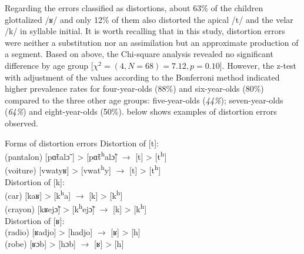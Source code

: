 \documentclass[output=paper,newtxmath,modfonts,nonflat,draftmode]{langsci/langscibook}
\begin{document}
Regarding the errors classified as distortions, about 63\% of the children glottalized /ʁ/ and only 12\% of them also distorted the apical /t/ and the velar /k/ in syllable initial. It is worth recalling that in this study, distortion errors were neither a substitution nor an assimilation but an approximate production of a segment. Based on  above, the Chi-square analysis revealed no significant difference by age group [$\chi^2 = (4, N=68) = 7.12, p=0.10$]. However, the z-test with adjustment of the values according to the Bonferroni method indicated higher prevalence rates for four-year-olds (88\%) and six-year-olds (80\%) compared to the three other age groups: five-year-olds (\textit{44\%}); seven-year-olds (\textit{64\%}) and eight-year-olds (50\%).  below shows examples of distortion errors observed. 

\ea Forms of distortion errors \label{ex:takam:distortion_errors}
\ea Distortion of [t]:\\
(pantalon) [pɑ̃talɔ̃ ] > [pɑ̃t\textsuperscript{h}alɔ̃] $\rightarrow$ [t] > [t\textsuperscript{h}]\\
(voiture) [vwatyʁ] > [vwat\textsuperscript{h}y] $\rightarrow$ [t] > [t\textsuperscript{h}]\\
\ex Distortion of [k]:\\ 
(car) [kaʁ] > [k\textsuperscript{h}a] $\rightarrow$ [k] > [k\textsuperscript{h}]\\
(crayon) [kʁejɔ̃] > [k\textsuperscript{h}ejɔ̃] $\rightarrow$ [k] > [k\textsuperscript{h}]\\
\ex Distortion of [ʁ]:\\
(radio) [ʁadjo] > [hadjo] $\rightarrow$ [ʁ] > [h]\\
(robe) [ʁɔb] > [hɔb] $\rightarrow$ [ʁ] > [h] \\
\z
\z

\end{document}
